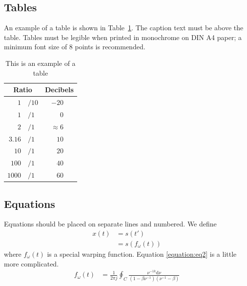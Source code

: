 \documentclass{INTERSPEECH2023}
\begin{document}
\subsection{Tables}

An example of a table is shown in Table~\ref{tab:example}. The caption text must be above the table. Tables must be legible when printed in monochrome on DIN A4 paper; a minimum font size of 8 points is recommended.

\begin{table}[th]
  \caption{This is an example of a table}
  \label{tab:example}
  \centering
  \begin{tabular}{ r@{}l  r }
    \toprule
    \multicolumn{2}{c}{\textbf{Ratio}} & 
                                         \multicolumn{1}{c}{\textbf{Decibels}} \\
    \midrule
    $1$                       & $/10$ & $-20$~~~             \\
    $1$                       & $/1$  & $0$~~~               \\
    $2$                       & $/1$  & $\approx 6$~~~       \\
    $3.16$                    & $/1$  & $10$~~~              \\
    $10$                      & $/1$  & $20$~~~              \\
    $100$                     & $/1$  & $40$~~~              \\
    $1000$                    & $/1$  & $60$~~~              \\
    \bottomrule
  \end{tabular}
  
\end{table}


\subsection{Equations}

Equations should be placed on separate lines and numbered. We define
% 
\begin{align}
  x(t) &= s(t') \nonumber \\ 
       &= s(f_\omega(t))
\end{align}
% 
where \(f_\omega(t)\) is a special warping function. Equation \ref{equation:eq2} is a little more complicated.
% 
\begin{align}
  f_\omega(t) &= \frac{1}{2 \pi j} \oint_C 
  \frac{\nu^{-1k} \mathrm{d} \nu}
  {(1-\beta\nu^{-1})(\nu^{-1}-\beta)}
  \label{equation:eq2}
\end{align}
% 
\end{document}
